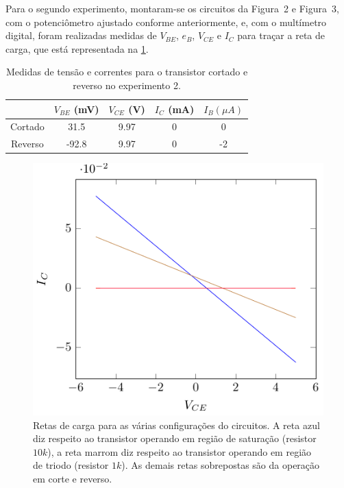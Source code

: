 \documentclass[12pt,a4paper]{article}
\begin{document}
        Para o segundo experimento, montaram-se os circuitos da Figura~2 e Figura~3, com o potenciômetro
        ajustado conforme anteriormente, e, com o multímetro digital, foram realizadas medidas de $V_{BE}$,
        $e_B$, $V_{CE}$ e $I_C$ para traçar a reta de carga, que está representada na \ref{fig:carga}.

      \begin{table}[H]
        \centering
        \caption{Medidas de tensão e correntes para o transistor cortado e reverso no experimento 2.}
        \label{tab:ex2}
        \begin{tabular}{ c c c c c }
                         \\ \toprule
                   & $V_{BE}$ (mV) & $V_{CE}$ (V) & $I_C$ (mA) & $I_{B}(\mu A)$ \\ \midrule
           Cortado & 31.5          & 9.97         & 0          & 0\\ \midrule 
           Reverso & -92.8         & 9.97         & 0 & -2          \\ \bottomrule
        \end{tabular}
        \end{table}

        \begin{figure}[htpb]
          \centering
          \includegraphics[width=0.8\linewidth]{./img/reta.pdf}
          \caption{Retas de carga para as várias configurações do circuitos. A reta azul 
            diz respeito ao transistor operando em região de saturação (resistor $10k$), a reta
          marrom diz respeito ao transistor operando em região de triodo (resistor $1k$). As demais retas
        sobrepostas são da operação em corte e reverso.}
          \label{fig:carga}
        \end{figure}
\end{document}
